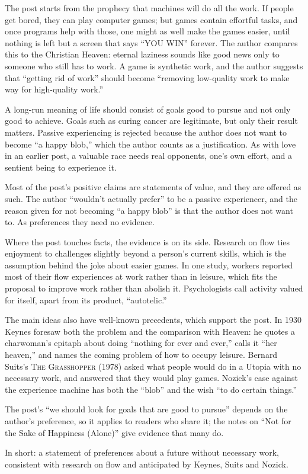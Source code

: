 \begin{afterword}
\summaryhead

The post starts from the prophecy that machines will do all the work. If people get bored, they can play computer games; but games contain effortful tasks, and once programs help with those, one might as well make the games easier, until nothing is left but a screen that says ``YOU WIN'' forever. The author compares this to the Christian Heaven: eternal laziness sounds like good news only to someone who still has to work. A game is synthetic work, and the author suggests that ``getting rid of work'' should become ``removing low-quality work to make way for high-quality work.''

A long-run meaning of life should consist of goals good to pursue and not only good to achieve. Goals such as curing cancer are legitimate, but only their result matters. Passive experiencing is rejected because the author does not want to become ``a happy blob,'' which the author counts as a justification. As with love in an earlier post, a valuable race needs real opponents, one's own effort, and a sentient being to experience it.

\responsehead

Most of the post's positive claims are statements of value, and they are offered as such. The author ``wouldn't actually prefer'' to be a passive experiencer, and the reason given for not becoming ``a happy blob'' is that the author does not want to. As preferences they need no evidence.

Where the post touches facts, the evidence is on its side. Research on flow ties enjoyment to challenges slightly beyond a person's current skills, which is the assumption behind the joke about easier games. In one study, workers reported most of their flow experiences at work rather than in leisure, which fits the proposal to improve work rather than abolish it. Psychologists call activity valued for itself, apart from its product, ``autotelic.''

The main ideas also have well-known precedents, which support the post. In 1930 Keynes foresaw both the problem and the comparison with Heaven: he quotes a charwoman's epitaph about doing ``nothing for ever and ever,'' calls it ``her heaven,'' and names the coming problem of how to occupy leisure. Bernard Suits's \textsc{The Grasshopper} (1978) asked what people would do in a Utopia with no necessary work, and answered that they would play games. Nozick's case against the experience machine has both the ``blob'' and the wish ``to do certain things.''

The post's ``we should look for goals that are good to pursue'' depends on the author's preference, so it applies to readers who share it; the notes on ``Not for the Sake of Happiness (Alone)'' give evidence that many do.

In short: a statement of preferences about a future without necessary work, consistent with research on flow and anticipated by Keynes, Suits and Nozick.
\end{afterword}
